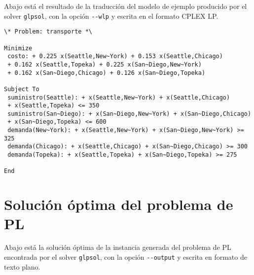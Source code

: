 \documentclass[11pt,spanish]{report}
\begin{document}
Abajo está el resultado de la traducción del modelo de ejemplo producido por el solver \verb|glpsol|, con la opción \verb|--wlp| y escrita en el formato CPLEX LP.

\medskip

\begin{verbatim}
\* Problem: transporte *\

Minimize
 costo: + 0.225 x(Seattle,New~York) + 0.153 x(Seattle,Chicago)
 + 0.162 x(Seattle,Topeka) + 0.225 x(San~Diego,New~York)
 + 0.162 x(San~Diego,Chicago) + 0.126 x(San~Diego,Topeka)

Subject To
 suministro(Seattle): + x(Seattle,New~York) + x(Seattle,Chicago)
 + x(Seattle,Topeka) <= 350
 suministro(San~Diego): + x(San~Diego,New~York) + x(San~Diego,Chicago)
 + x(San~Diego,Topeka) <= 600
 demanda(New~York): + x(Seattle,New~York) + x(San~Diego,New~York) >= 325
 demanda(Chicago): + x(Seattle,Chicago) + x(San~Diego,Chicago) >= 300
 demanda(Topeka): + x(Seattle,Topeka) + x(San~Diego,Topeka) >= 275

End
\end{verbatim}

\section{Solución óptima del problema de PL}

Abajo está la solución óptima de la instancia generada del problema de PL encontrada por el solver \verb|glpsol|, con la opción \verb|--output| y escrita en formato de texto plano.

\medskip
\end{document}
